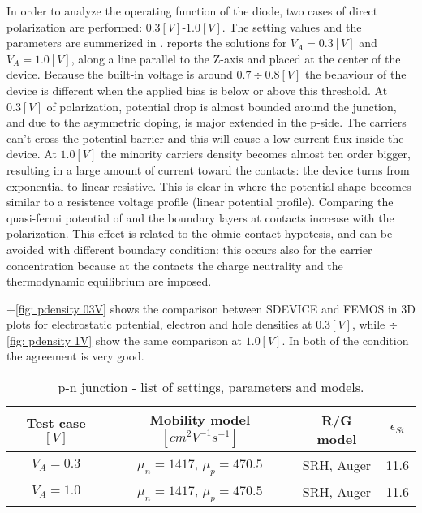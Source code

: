 In order to analyze the operating function of the diode, two cases of direct polarization are performed: $0.3[V]$-$1.0[V]$. The setting values and the parameters are summerized in . 
 reports the solutions for $V_A=0.3[V]$ and $V_A=1.0[V]$, along a line parallel to the Z-axis and placed at the center of the device. 
Because the built-in voltage is around $0.7 \div 0.8 [V]$ the behaviour of the device is different when the applied bias is below or above this threshold. 
At $0.3[V]$ of polarization, potential drop is almost bounded around the junction, and due to the asymmetric doping, is major extended in the p-side. The carriers can't cross the potential barrier and this will cause a low current flux inside the device.
At $1.0[V]$ the minority carriers density becomes almost ten order bigger, resulting in a large amount of current toward the contacts:  the device turns from exponential to linear resistive. This is clear in  where the potential shape becomes similar to a resistence voltage profile (linear potential profile). Comparing the quasi-fermi potential of  and  the boundary layers at contacts increase with the polarization. This effect is related to the ohmic contact hypotesis, and can be avoided with different boundary condition: this occurs also for the carrier concentration because at the contacts the charge neutrality and the thermodynamic equilibrium  are imposed.

$\div$\ref{fig: pdensity 03V} shows the comparison between SDEVICE and FEMOS in 3D plots for electrostatic potential, electron and hole densities at $0.3[V]$, while $\div$\ref{fig: pdensity 1V} show the same comparison at $1.0[V]$. In both of the condition the agreement is very good.

\begin{table}[!h]
\centering
\begin{tabular}{cccc}
\toprule
 Test case $[V]$  & Mobility model $[cm^2V^{-1}s^{-1}]$  & R/G model & $\epsilon_{Si}$\\
\midrule
$V_A=0.3$ & $\mu_n = 1417$, $\mu_p = 470.5$ & SRH, Auger & 11.6 \\
$V_A=1.0$ & $\mu_n = 1417$, $\mu_p = 470.5$ & SRH, Auger & 11.6 \\\bottomrule
\end{tabular}
\caption{p-n junction - list of settings, parameters and models.}
\label{tab: diode direct}
\end{table}


